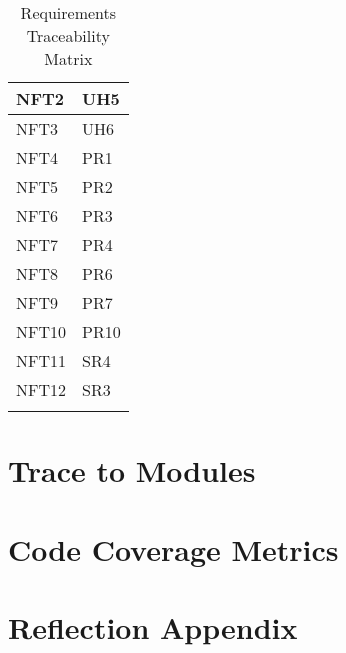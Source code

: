 \documentclass[12pt, titlepage]{article}
\begin{document}
\begin{longtable}{| p{} | p{} |}
  \hline
  NFT2 & UH5\\
  \hline
  NFT3 & UH6\\
  \hline
  NFT4 & PR1\\
  \hline
  NFT5 & PR2\\
  \hline
  NFT6 & PR3\\
  \hline
  NFT7 & PR4\\
  \hline
  NFT8 & PR6\\
  \hline
  NFT9 & PR7\\
  \hline
  NFT10 & PR10\\
  \hline
  NFT11 & SR4\\
  \hline
  NFT12 & SR3\\
  \hline
\caption{Requirements Traceability Matrix}
\end{longtable}
		
\section{Trace to Modules}		

\section{Code Coverage Metrics}

\appendix
\section{Reflection Appendix}




\nocite{*}
\end{document}
